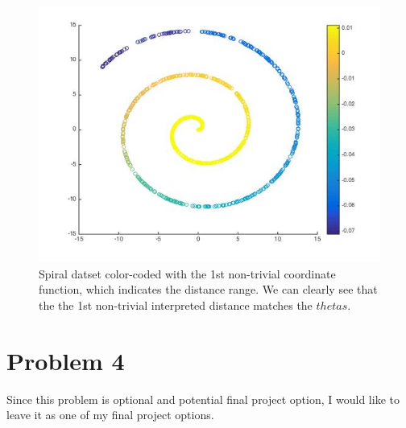 \documentclass[twoside]{article}
\theoremstyle{definition}
\theoremstyle{definition}
\theoremstyle{remark}
\begin{document}
\begin{figure}[H]
\centering
\includegraphics[width=120mm]{part3_3.jpg}
\caption{Spiral datset color-coded with the 1st non-trivial coordinate function, which indicates the distance range. We can clearly see that the the 1st non-trivial interpreted distance matches the $thetas$. \label{problem1Pic2}}
\end{figure}


\section{ Problem 4}
Since this problem is optional and potential final project option, I would like to leave it as one of my final project options. 
\end{document}
